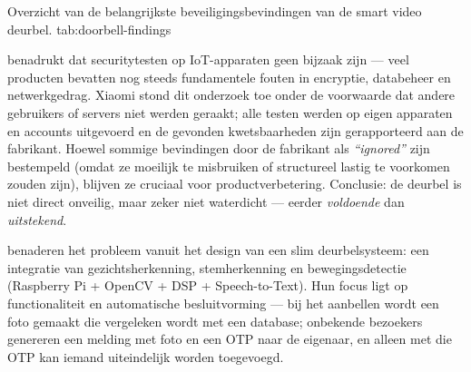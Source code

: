 \documentclass[nonacm,sigconf]{acmart}
\begin{document}
    \SimpleTable
    {Overzicht van de belangrijkste beveiligingsbevindingen van de smart video deurbel.}
    {tab:doorbell-findings}
    {
    }

    \noindent
    \citeauthor{liu2021ethical} benadrukt dat securitytesten op IoT-apparaten geen bijzaak zijn — veel producten bevatten nog steeds fundamentele fouten in encryptie, databeheer en netwerkgedrag. Xiaomi stond dit onderzoek toe onder de voorwaarde dat andere gebruikers of servers niet werden geraakt; alle testen werden op eigen apparaten en accounts uitgevoerd en de gevonden kwetsbaarheden zijn gerapporteerd aan de fabrikant. Hoewel sommige bevindingen door de fabrikant als \textit{``ignored''} zijn bestempeld (omdat ze moeilijk te misbruiken of structureel lastig te voorkomen zouden zijn), blijven ze cruciaal voor productverbetering. Conclusie: de deurbel is niet direct onveilig, maar zeker niet waterdicht — eerder \emph{voldoende} dan \emph{uitstekend}.

    \bigskip


    \parencite{chaudhari2020smart} benaderen het probleem vanuit het design van een slim deurbelsysteem: een integratie van gezichtsherkenning, stemherkenning en bewegingsdetectie (Raspberry Pi + OpenCV + DSP + Speech-to-Text). Hun focus ligt op functionaliteit en automatische besluitvorming — bij het aanbellen wordt een foto gemaakt die vergeleken wordt met een database; onbekende bezoekers genereren een melding met foto en een OTP naar de eigenaar, en alleen met die OTP kan iemand uiteindelijk worden toegevoegd.
\end{document}
